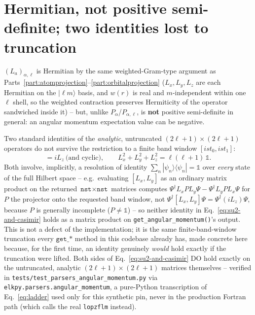 \documentclass[11pt]{article}
\begin{document}
\section{Hermitian, not positive semi-definite; two identities lost to truncation}

$(L_a)_{\alpha,\ell}$ is Hermitian by the same weighted-Gram-type argument as
Parts~\ref{part:atomprojection}--\ref{part:orbitalprojection} ($L_x,L_y,L_z$ are each
Hermitian on the $|\ell m\rangle$ basis, and $w(r)$ is real and $m$-independent within one
$\ell$ shell, so the weighted contraction preserves Hermiticity of the operator sandwiched
inside it) -- but, unlike $P_\alpha$/$P_{\alpha,\ell}$, is \textbf{not} positive
semi-definite in general: an angular momentum expectation value can be negative.

Two standard identities of the \emph{analytic}, untruncated $(2\ell{+}1)\times(2\ell{+}1)$
operators do not survive the restriction to a finite band window $[ist_0,ist_1]$:
\begin{equation}
  [L_x,L_y] = iL_z \ \text{(and cyclic)}, \qquad
  L_x^2+L_y^2+L_z^2 = \ell(\ell+1)\,\mathbb 1.
  \label{eq:su2-and-casimir}
\end{equation}
Both involve, implicitly, a resolution of identity $\sum_n|\psi_n\rangle\langle\psi_n|=
\mathbb 1$ over \emph{every} state of the full Hilbert space -- e.g.\ evaluating
$[L_x,L_y]$ as an ordinary matrix product on the returned $\texttt{nst}\times\texttt{nst}$
matrices computes $\Psi^\dagger L_xPL_y\Psi-\Psi^\dagger L_yPL_x\Psi$ for $P$ the projector
onto the requested band window, not $\Psi^\dagger[L_x,L_y]\Psi=\Psi^\dagger(iL_z)\Psi$,
because $P$ is generally incomplete ($P\ne\mathbb 1$) -- so neither identity in
Eq.~\eqref{eq:su2-and-casimir} holds as a matrix product on
\texttt{get\_angular\_momentum()}'s output. This is not a defect of the implementation; it
is the same finite-band-window truncation every $\texttt{get\_*}$ method in this codebase
already has, made concrete here because, for the first time, an identity genuinely
\emph{would} hold exactly if the truncation were lifted. Both sides of
Eq.~\eqref{eq:su2-and-casimir} DO hold exactly on the untruncated, analytic
$(2\ell{+}1)\times(2\ell{+}1)$ matrices themselves -- verified in
\texttt{tests/test\_parsers\_angular\_momentum.py} via
\texttt{elkpy.parsers.angular\_momentum}, a pure-Python transcription of
Eq.~\eqref{eq:ladder} used only for this synthetic pin, never in the production Fortran
path (which calls the real \texttt{lopzflm} instead).
\end{document}
